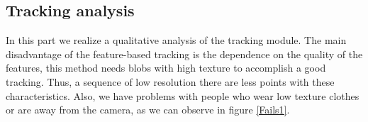 \begin{table}[H]
\centering

\caption{Comparision tracking modules.}
\label{tableResultsTrack}
\end{table}

\subsection{Tracking analysis}

In this part we realize a qualitative analysis of the tracking module. The main disadvantage of the feature-based tracking is the dependence on the quality of the features, this method needs blobs with high texture to accomplish a good tracking. Thus, a sequence of low resolution there are less points with these characteristics. Also, we have problems with people who wear low texture clothes or are away from the camera, as we can observe in figure \ref{Fails1}.


